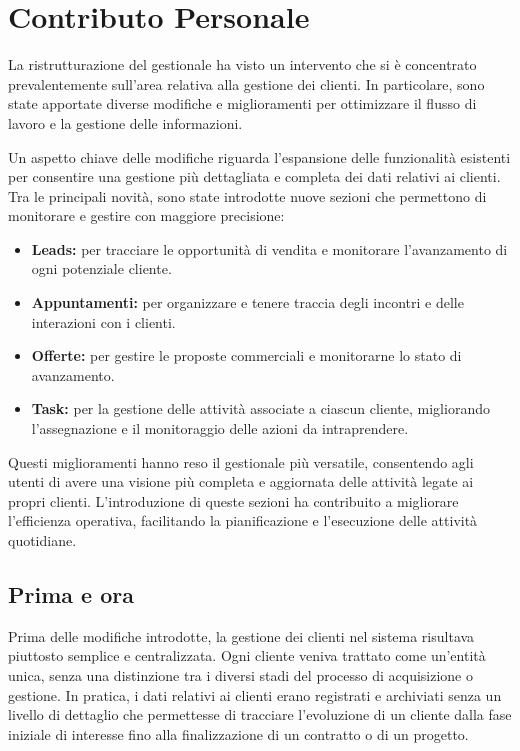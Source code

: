 \chapter{Contributo Personale}\label{chapter:implementazioni}
La ristrutturazione del gestionale ha visto un intervento che si è concentrato prevalentemente sull'area relativa alla gestione dei clienti. In particolare, sono state apportate diverse modifiche e miglioramenti per ottimizzare il flusso di lavoro e la gestione delle informazioni.

Un aspetto chiave delle modifiche riguarda l'espansione delle funzionalità esistenti per consentire una gestione più dettagliata e completa dei dati relativi ai clienti. Tra le principali novità, sono state introdotte nuove sezioni che permettono di monitorare e gestire con maggiore precisione:
\begin{itemize}
    \item \textbf{Leads:} per tracciare le opportunità di vendita e monitorare l'avanzamento di ogni potenziale cliente.
    \item \textbf{Appuntamenti:} per organizzare e tenere traccia degli incontri e delle interazioni con i clienti.
    \item \textbf{Offerte:} per gestire le proposte commerciali e monitorarne lo stato di avanzamento.
    \item \textbf{Task:} per la gestione delle attività associate a ciascun cliente, migliorando l'assegnazione e il monitoraggio delle azioni da intraprendere.
\end{itemize}
Questi miglioramenti hanno reso il gestionale più versatile, consentendo agli utenti di avere una visione più completa e aggiornata delle attività legate ai propri clienti. L'introduzione di queste sezioni ha contribuito a migliorare l'efficienza operativa, facilitando la pianificazione e l'esecuzione delle attività quotidiane.
\pagebreak
\section{Prima e ora}\label{sec:cap_sec_subsec_prima_e_ora}
Prima delle modifiche introdotte, la gestione dei clienti nel sistema risultava piuttosto semplice e centralizzata. Ogni cliente veniva trattato come un'entità unica, senza una distinzione tra i diversi stadi del processo di acquisizione o gestione. In pratica, i dati relativi ai clienti erano registrati e archiviati senza un livello di dettaglio che permettesse di tracciare l'evoluzione di un cliente dalla fase iniziale di interesse fino alla finalizzazione di un contratto o di un progetto.

